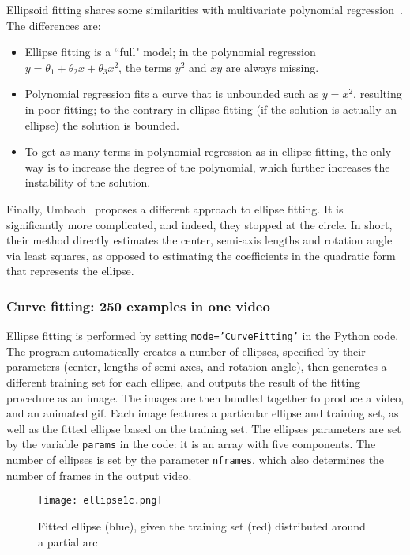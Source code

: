 \documentclass[oneside,10pt]{book}
\begin{document}
\noindent Ellipsoid fitting shares some similarities with multivariate polynomial regression~\cite{vaccari2007}.  The differences are:
\begin{itemize}
\item Ellipse fitting is a ``full" model;  in the polynomial regression $y=\theta_1+\theta_2 x + \theta_3 x^2$, the terms $y^2$ and $xy$ are always missing.
\item Polynomial regression fits a curve that is unbounded such as $y=x^2$, resulting in poor fitting; to the contrary in ellipse fitting (if the solution is actually an ellipse) the solution is bounded.
 \item To get as many terms in polynomial regression as in ellipse fitting, the only way is to increase the degree of the polynomial, which further increases the instability of the solution.
\end{itemize}

\noindent Finally, Umbach~\cite{ieee200y} proposes a different approach to ellipse fitting. It is significantly more complicated, and indeed, they stopped at the circle. In short, their method directly estimates the center, semi-axis lengths and rotation angle via least squares, as opposed to estimating the coefficients in the quadratic form that represents the ellipse.

\subsubsection{Curve fitting: 250 examples in one video}

Ellipse fitting is performed by setting \texttt{mode='CurveFitting'} in the Python code. The program automatically creates a number of ellipses, specified by their parameters (center, lengths of semi-axes, and rotation angle), then generates a different training set for each ellipse, and outputs the result of the fitting procedure as an image. The images are then bundled together to produce a video, and an animated gif. Each image features a particular
 ellipse and training set, as well as the fitted ellipse based on the training set. The ellipses parameters are set by the variable \texttt{params} in the code: it is an array with five components. The number of ellipses is set by the parameter \texttt{nframes}, which also determines the number of frames in the output video.

\begin{figure}%
\centering
\texttt{[image: ellipse1c.png]}
\caption{Fitted ellipse (blue), given the training set (red) distributed around a partial arc}
\label{fig:ellipse11b}
\end{figure}
\end{document}
